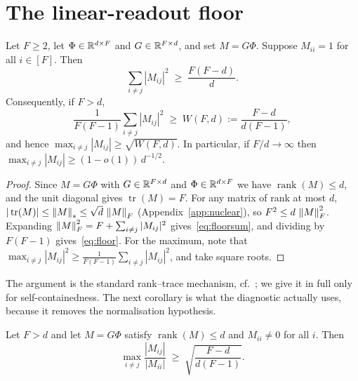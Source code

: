 \section{The linear-readout floor}
\label{sec:floor}

\begin{theorem}
\label{thm:floor}
Let $F\ge2$, let $\Phi\in\mathbb{R}^{d\times F}$ and $G\in\mathbb{R}^{F\times d}$, and set $M=G\Phi$. Suppose
$M_{ii}=1$ for all $i\in[F]$. Then
\begin{equation}
  \sum_{i\neq j}|M_{ij}|^2\;\ge\;\frac{F(F-d)}{d}.
  \label{eq:floorsum}
\end{equation}
Consequently, if $F>d$,
\begin{equation}
  \frac{1}{F(F-1)}\sum_{i\neq j}|M_{ij}|^2\;\ge\;W(F,d):=\frac{F-d}{d(F-1)},
  \label{eq:floor}
\end{equation}
and hence $\max_{i\neq j}|M_{ij}|\ge\sqrt{W(F,d)}$. In particular, if $F/d\to\infty$ then
$\max_{i\neq j}|M_{ij}|\ge(1-o(1))\,d^{-1/2}$.
\end{theorem}

\begin{proof}
Since $M=G\Phi$ with $G\in\mathbb{R}^{F\times d}$ and $\Phi\in\mathbb{R}^{d\times F}$ we have
$\operatorname{rank}(M)\le d$, and the unit diagonal gives $\operatorname{tr}(M)=F$. For any
matrix of rank at most $d$, $|\operatorname{tr}(M)|\le\left\lVert M \right\rVert_*\le\sqrt d\,\left\lVert M \right\rVert_F$
(Appendix~\ref{app:nuclear}), so $F^2\le d\,\left\lVert M \right\rVert_F^2$. Expanding
$\left\lVert M \right\rVert_F^2=F+\sum_{i\neq j}|M_{ij}|^2$ gives~\eqref{eq:floorsum}, and dividing by $F(F-1)$
gives~\eqref{eq:floor}. For the maximum, note that
$\max_{i\neq j}|M_{ij}|^2\ge\frac{1}{F(F-1)}\sum_{i\neq j}|M_{ij}|^2$, and take square roots.
\end{proof}

The argument is the standard rank--trace mechanism, cf.~\cite{datta2012geometry}; we give it
in full only for self-containedness. The next corollary is what the diagnostic actually uses,
because it removes the normalisation hypothesis.

\begin{corollary}
\label{cor:calibfree}
Let $F>d$ and let $M=G\Phi$ satisfy $\operatorname{rank}(M)\le d$ and $M_{ii}\neq0$ for all
$i$. Then
\[
  \max_{i\neq j}\frac{|M_{ij}|}{|M_{ii}|}\;\ge\;\sqrt{\frac{F-d}{d(F-1)}}.
\]
\end{corollary}

